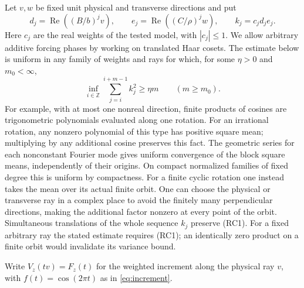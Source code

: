 \documentclass[11pt,a4paper]{article}
\begin{document}
Let $v,w$ be fixed unit physical and transverse directions and put
\[
 d_j=\operatorname{Re}((B/b)^j v),\qquad
 e_j=\operatorname{Re}((C/\rho)^j w),\qquad
 k_j=c_jd_je_j .
\]
Here $c_j$ are the real weights of the tested model, with $|c_j|\le1$.
We allow arbitrary additive forcing phases by working on translated Haar
cosets. The estimate below is uniform in any family of weights and rays
for which, for some $\eta>0$ and $m_0<\infty$,
\begin{equation}
 \inf_{i\in\mathbb Z}\sum_{j=i}^{i+m-1} k_j^2\ge\eta m
 \qquad(m\ge m_0). \tag{RC1}
\end{equation}
For example, with at most one nonreal direction, finite products of
cosines are trigonometric polynomials evaluated along one rotation.
For an irrational rotation, any nonzero polynomial of this type has
positive square mean; multiplying by any additional cosine preserves
this fact. The geometric series for each nonconstant Fourier mode gives
uniform convergence of the block square means, independently of their
origins. On compact normalized families of fixed degree this is uniform
by compactness. For a finite cyclic rotation one instead takes the mean
over its actual finite orbit. One can choose the physical or transverse
ray in a complex place to avoid the finitely many perpendicular
directions, making the additional factor nonzero at every point of the
orbit. Simultaneous translations of the whole sequence $k_j$ preserve
(RC1). For a fixed arbitrary ray the stated estimate requires (RC1);
an identically zero product on a finite orbit would invalidate its
variance bound.

Write $V_z(tv)=F_z(t)$ for the weighted increment along the physical
ray $v$, with $f(t)=\cos(2\pi t)$ as in \eqref{eq:increment}.
\end{document}
